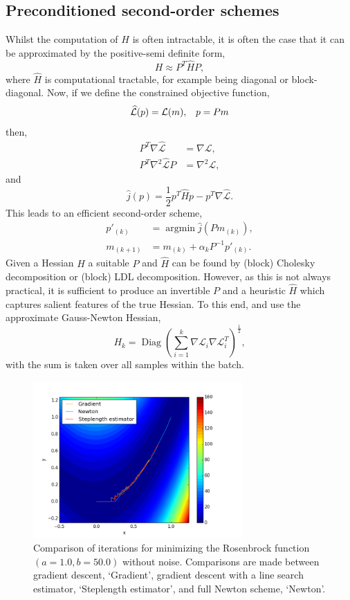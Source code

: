 \documentclass[nohyperref]{article}
\theoremstyle{plain}
\theoremstyle{definition}
\theoremstyle{remark}
\DeclareMathOperator*{\Diag}{Diag}
\DeclareMathOperator*{\argmin}{argmin}
\begin{document}
\subsection{Preconditioned second-order schemes}
Whilst the computation of $H$ is often intractable, it is often the case that it can be approximated by the positive-semi definite form,
\begin{equation}
H \approx P^T \widehat{H} P,
\end{equation}
where $\widehat{H}$ is computational tractable, for example being diagonal or block-diagonal.  Now, if we define the constrained objective function,
\begin{equation}
\widehat{\mathcal{L}}(p)=\mathcal{L}(m), \hspace{0,3cm} p=Pm
\end{equation}
then,
\begin{align}
P^T \nabla \widehat{\mathcal{L}}&=\nabla \mathcal{L},\\
P^T \nabla^2 \widehat{\mathcal{L}} P&=\nabla^2 \mathcal{L},
\end{align}
and
\begin{equation}
\widehat{j}(p)=\frac{1}{2}p^T \widehat{H} p-p^T\nabla\widehat{\mathcal{L}}.
\end{equation} 
This leads to an efficient second-order scheme, 
\begin{align}
p'_{(k)}&=\argmin{\widehat{j}(P m_{(k)})},\\
m_{(k+1)}&=m_{(k)}+\alpha_{k}P^{-1} p'_{(k)}.
\end{align}
Given a Hessian $H$ a suitable $P$ and $\widehat{H}$ can be found by (block) Cholesky decomposition or (block) LDL decomposition. However, as this is not always practical, it is sufficient to produce an invertible $P$ and a heuristic $\widehat{H}$ which captures salient features of the true Hessian. To this end, \citet{Asi:BetterStoch} and \citet{Martens:Deep} use the approximate Gauss-Newton Hessian,
\begin{equation}
H_k=\Diag{\left(\sum_{i=1}^k \nabla \mathcal{L}_i \nabla \mathcal{L}_i ^T\right)^{\frac{1}{2}}},
\end{equation}
with the sum is taken over all samples within the batch.
\begin{figure}[!ht]
\centering
\includegraphics[height=6cm, width=8cm]{../src-rosen/Rosenbrock_iterations.png}
\caption{Comparison of iterations for minimizing the Rosenbrock function $(a=1.0, b=50.0)$ without noise. Comparisons are made between gradient descent, `Gradient', gradient descent with a line search estimator, `Steplength estimator', and full Newton scheme, `Newton'.}\label{Rosenbrock_iter1}
\end{figure}
\end{document}
